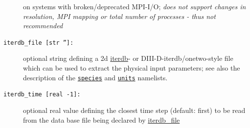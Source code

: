 \documentclass[12pt]{article}
\begin{document}
\begin{description}
on systems with broken/deprecated MPI-I/O; {\em does not support changes in resolution, MPI mapping or
total number of processes - thus not recommended}
\item[\hypertarget{iterdb_file}{\tt iterdb\_file [str '']:}] optional string defining a 2d
\href{http://tokamak-profiledb.ccfe.ac.uk/}{iterdb}- or DIII-D-iterdb/onetwo-style file
which can be used to extract the physical input parameters;
see also the description of the \hyperlink{species_nml}{\tt species} and
\hyperlink{units_nml}{\tt units} namelists.
\item[\texttt{iterdb\_time [real -1]:}] optional real value defining the closest time step (default: first)
to be read from the data base file being declared by \hyperlink{iterdb_file}{iterdb\_file}
\end{description}
\end{document}
